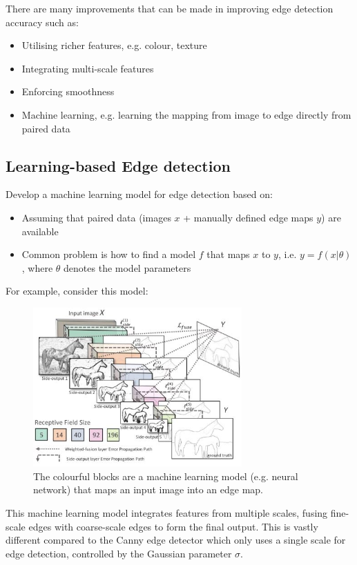 \documentclass{report}
\begin{document}
There are many improvements that can be made in improving edge detection accuracy such as:
\begin{itemize}
    \item Utilising richer features, e.g. colour, texture
    \item Integrating multi-scale features
    \item Enforcing smoothness
    \item Machine learning, e.g. learning the mapping from image to edge directly from paired data
\end{itemize}

\subsection{Learning-based Edge detection}

Develop a machine learning model for edge detection based on:
\begin{itemize}
    \item Assuming that paired data (images $x$ + manually defined edge maps
    $y$) are available
    \item Common problem is how to find a model $f$ that maps $x$ to $y$, i.e. $y=f(x|\theta)$ , where
    $\theta$ denotes the model parameters
\end{itemize}

For example, consider this model:
\begin{figure}[h]
    \centering
    \includegraphics[width=8cm]{Learning-based approach.JPG}
    \caption{The colourful blocks are a machine learning model (e.g. neural
    network) that maps an input image into an edge map.}
\end{figure}

This machine learning model integrates features from multiple scales, fusing
fine-scale edges with coarse-scale edges to form the final output. This is
vastly different compared to the Canny edge detector which only uses a single
scale for edge detection, controlled by the Gaussian parameter $\sigma$.
\end{document}
